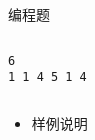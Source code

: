 \begin{frame}[fragile]
{\begin{exampleblock}{编程题}
{\begin{columns}[onlytextwidth,T]
\begin{itemize}
                            \lstinline|6|\\
                            \lstinline|1 1 4 5 1 4|

                    \end{itemize}

                \end{columns}

                \begin{itemize}
                    \item 样例说明


\end{itemize}}
\end{exampleblock}}
\end{frame}
